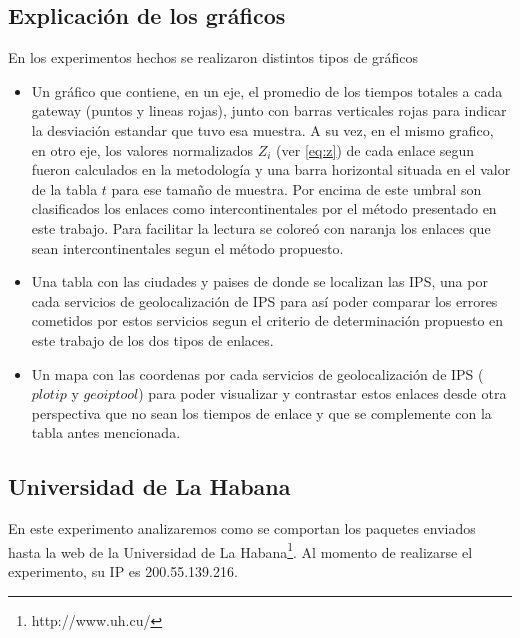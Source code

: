 \subsection{Explicación de los gráficos}

En los experimentos hechos se realizaron distintos tipos de gráficos

\begin{itemize}
	\item Un gráfico que contiene, en un eje, el promedio de los tiempos totales
	a cada gateway (puntos y lineas rojas), junto con barras verticales rojas
	para indicar la desviación estandar que tuvo esa muestra. A su vez, en el
	mismo grafico, en otro eje, los valores normalizados $Z_{i}$ (ver
	\ref{eq:z}) de cada enlace segun fueron calculados en la metodología y una
	barra horizontal situada en el valor de la tabla $t$ para ese tamaño de
	muestra.  Por encima de este umbral son clasificados los enlaces como
	intercontinentales por el método presentado en este trabajo.  Para
	facilitar la lectura se coloreó con naranja los enlaces que sean
	intercontinentales segun el método propuesto.

	\item Una tabla con las ciudades y paises de donde se localizan las IPS,
	una por cada servicios de geolocalización de IPS para así poder comparar
	los errores cometidos por estos servicios segun el criterio de
	determinación propuesto en este trabajo de los dos tipos de enlaces.

	\item Un mapa con las coordenas por cada servicios de geolocalización de
	IPS ($plotip$ y $geoiptool$) para poder visualizar y contrastar estos
	enlaces desde otra perspectiva que no sean los tiempos de enlace y que
	se complemente con la tabla antes mencionada.
\end{itemize}



\subsection{Universidad de La Habana}

En este experimento analizaremos como se comportan los paquetes enviados hasta la web de la Universidad de La Habana\footnote{http://www.uh.cu/}. Al momento de realizarse el experimento, su IP es 200.55.139.216.

